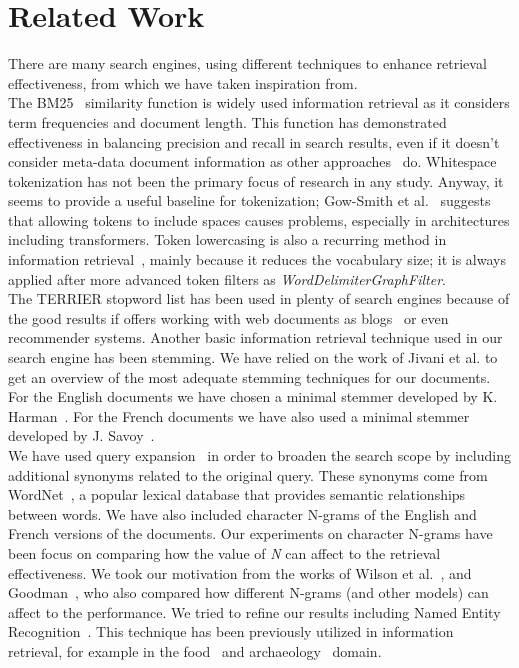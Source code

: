 \section{Related Work}
\label{sec:related}

There are many search engines, using different techniques to enhance retrieval effectiveness, from which we have taken
inspiration from.\\

The BM25~\cite{BM25} similarity function is widely used information retrieval as it considers term frequencies and document length.
This function has demonstrated effectiveness in balancing precision and recall in search results, even if it
doesn't consider meta-data document information as other approaches~\cite{robertson2009probabilistic} do.
Whitespace tokenization has not been the primary focus of research in any study.
Anyway, it seems to provide a useful baseline for tokenization;
Gow-Smith et al.~\cite{gowsmith2022improving} suggests that allowing tokens to include spaces causes problems,
especially in architectures including transformers.
Token lowercasing is also a recurring method in information retrieval~\cite{manning2008introduction}, mainly because it
reduces the vocabulary size;
it is always applied after more advanced token filters as \textit{WordDelimiterGraphFilter}.\\

The TERRIER stopword list has been used in plenty of search engines because of the good results if offers working with
web documents as blogs~\cite{Ounis2006OverviewOT} or even recommender systems.
Another basic information retrieval technique used in our search engine has been stemming.
We have relied on the work of Jivani et al.\cite{jivani2011comparative} to get an overview of the most adequate stemming
techniques for our documents.
For the English documents we have chosen a minimal stemmer developed by K. Harman~\cite{Harman1991HowEI}.
For the French documents we have also used a minimal stemmer developed by J. Savoy~\cite{frenchStemmer}.\\

We have used query expansion~\cite{efthimiadis1996query} in order to broaden the search scope by including additional
synonyms related to the original query.
These synonyms come from WordNet~\cite{Fellbaum1998}, a popular lexical database that provides semantic relationships
between words.
We have also included character N-grams of the English and French versions of the documents.
Our experiments on character N-grams have been focus on comparing how the value of \textit{N} can affect to the
retrieval effectiveness.
We took our motivation from the works of Wilson et al.~\cite{wilson2008comparing}, and Goodman~\cite{goodman2001bit},
who also compared how different N-grams (and other models) can affect to the performance.
We tried to refine our results including Named Entity Recognition~\cite{mohit2014named}.
This technique has been previously utilized in information retrieval, for example in the food~\cite{popovski2020survey}
and archaeology~\cite{brandsen2022can} domain.\\

